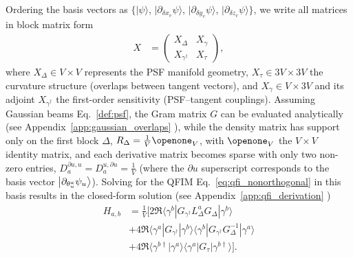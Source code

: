 \documentclass[reprint,amsmath,amssymb,aps,prl,floatfix,groupedaddress,superscriptaddress]{revtex4-2}
\begin{document}
Ordering the basis vectors as $\big\{|{\psi}\rangle$, $|{\partial_{\delta x_v} \psi}\rangle$, $|{\partial_{\delta y_v} \psi}\rangle$, $|{\partial_{\delta z_v} \psi}\rangle\big\}$, we write all matrices in block matrix form
\begin{align}\label{eatlean}
    X &= \begin{pmatrix}
        X_\Delta & X_\gamma\\
        X_{\gamma^\dagger} & X_\tau
    \end{pmatrix},
\end{align}
where $X_\Delta \in V \times V$ represents the PSF manifold geometry, $X_\tau \in 3V \times 3V$ the curvature structure (overlaps between tangent vectors), and $X_\gamma \in V \times 3V$ and its adjoint $X_{\gamma^\dagger}$ the first-order sensitivity (PSF–tangent couplings).
Assuming Gaussian beams Eq.~\eqref{def:psf}, the Gram matrix $G$ can be evaluated analytically (see Appendix~\ref{app:gaussian_overlaps} \cite{supposta}),
while the density matrix has support only on the first block $\Delta$, $R_\Delta = \frac{1}{V} \openone_V$,
with $\openone_V$ the $V\times V$ identity matrix, and each derivative matrix becomes sparse with only two non-zero entries,
    $D_a^{\partial u,u} = D_a^{u,\partial u} = \frac{1}{V}$ (where the $\partial u$ superscript corresponds to the basis vector $\ket{\partial_{\theta_u^a} \psi_u}$).
Solving for the QFIM Eq.~\eqref{eq:qfi_nonorthogonal} in this basis results in the closed-form solution (see Appendix~\ref{app:qfi_derivation} \cite{supposta})
{\color{red}
\begin{align}
    H_{a,b} &= \frac{1}{V} \big[ 2 \Re \langle{\gamma^b}| G_{\gamma^\dagger} L^a_\Delta G_\Delta |{\gamma^b}\rangle \nonumber\\
    &+ 4 \Re \langle{\gamma^a}|G_{\gamma^\dagger}|{\gamma^b}\rangle\langle{\gamma^b}|G_{\gamma^\dagger} G^{-1}_\Delta|{\gamma^a}\rangle \nonumber \\
    &+ 4 \Re \langle{\gamma^{b\dagger}}|{\gamma^a}\rangle\langle{\gamma^a}| G_\tau |{\gamma^{b\dagger}}\rangle \big].
    \label{eq:qfim_final}
\end{align}
}
\end{document}

